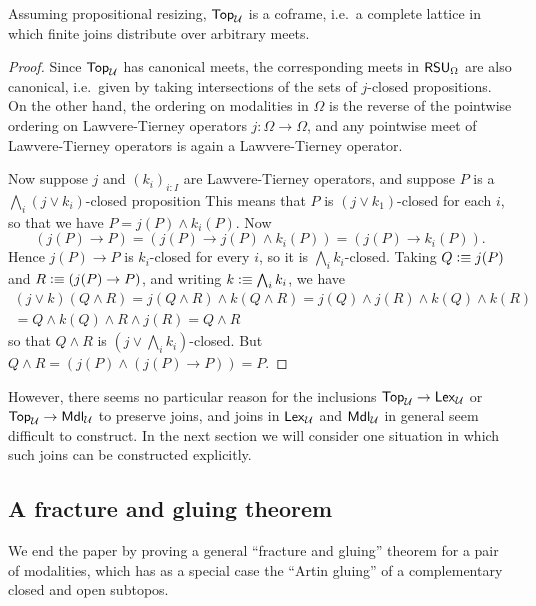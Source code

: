 \begin{cor}
  Assuming propositional resizing, $\tpl$ is a coframe, i.e.\ a complete lattice in which finite joins distribute over arbitrary meets.
\end{cor}
\begin{proof}
  Since $\tpl$ has canonical meets, the corresponding meets in $\rsu[\Omega]$ are also canonical, i.e.\ given by taking intersections of the sets of $j$-closed propositions.
  On the other hand, the ordering on modalities in $\Omega$ is the reverse of the pointwise ordering on Lawvere-Tierney operators $j:\Omega\to\Omega$, and any pointwise meet of Lawvere-Tierney operators is again a Lawvere-Tierney operator.

  Now suppose $j$ and $(k_i)_{i:I}$ are Lawvere-Tierney operators, and suppose $P$ is a $\bigwedge_i (j\lor k_i)$-closed proposition
  This means that $P$ is $(j\lor k_1)$-closed for each $i$, so that we have $P = j(P) \land k_i(P)$.
  Now
  \[ (j(P) \to P) =
  (j(P) \to j(P) \land k_i(P)) =
  (j(P) \to k_i(P)).
  \]
  Hence $j(P)\to P$ is $k_i$-closed for every $i$, so it is $\bigwedge_i k_i$-closed.
  Taking $Q \defeq j(P)$ and $R\defeq (j(P) \to P)$, and writing $k\defeq \bigwedge_i k_i$, we have
  \begin{multline*}
    (j\lor k)(Q\land R) = j(Q\land R) \land k(Q\land R) = j(Q)\land j(R) \land k(Q)\land k(R)\\
    = Q \land k(Q) \land R \land j(R) = Q\land R
  \end{multline*}
  so that $Q\land R$ is $(j\lor \bigwedge_i k_i)$-closed.
  But $Q\land R = (j(P) \land (j(P)\to P)) = P$.
\end{proof}

However, there seems no particular reason for the inclusions $\tpl \to \lex$ or $\tpl \to \mdl$ to preserve joins, and joins in $\lex$ and $\mdl$ in general seem difficult to construct.
In the next section we will consider one situation in which such joins can be constructed explicitly.



\subsection{A fracture and gluing theorem}
\label{sec:fracture}

We end the paper by proving a general ``fracture and gluing'' theorem for a pair of modalities, which has as a special case the ``Artin gluing'' of a complementary closed and open subtopos.

